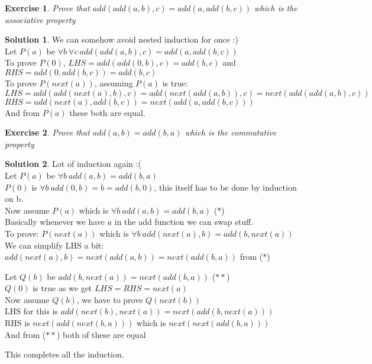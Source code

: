 \documentclass[a4paper,10pt]{article}
\newtheorem{exercise}{Exercise}[section]
\theoremstyle{definition} %
\newtheorem*{solution}{Solution}
\begin{document}
    \begin{exercise}
        Prove that $add(add(a,b), c) = add(a, add(b,c))$ which is the associative property
    \end{exercise}
    \begin{solution}
        We can somehow avoid nested induction for once :) \\
        Let $P(a)$ be $\forall b \ \forall c \ add(add(a,b), c) = add(a, add(b,c))$ \\
        To prove $P(0)$, $LHS = add(add(0,b), c) = add(b,c)$ and $RHS = add(0, add(b,c)) = add(b,c)$ \\
        To prove $P(next(a))$, assuming $P(a)$ is true: \\
        $LHS = add(add(next(a),b), c) = add(next(add(a,b)), c) = next(add(add(a,b), c))$ \\
        $RHS = add(next(a), add(b,c)) = next(add(a, add(b,c)))$ \\
        And from $P(a)$ these both are equal.
    \end{solution}

    \begin{exercise}
        Prove that $add(a,b) = add(b,a)$ which is the commutative property
    \end{exercise}
    \begin{solution}
        Lot of induction again :( \\
        Let $P(a)$ be $\forall b \ add(a,b) = add(b,a)$ \\
        $P(0)$ is $\forall b \ add(0,b) = b = add(b,0)$, this itself has to be done by induction on b. \\
        Now assume $P(a)$ which is $\forall b \ add(a,b) = add(b,a)$ \quad ($\ast$) \\
        Basically whenever we have $a$ in the add function we can swap stuff. \\
        To prove: $P(next(a))$ which is $\forall b \ add(next(a),b) = add(b,next(a))$ \\
        We can simplify LHS a bit: $add(next(a),b) = next(add(a,b)) = next(add(b,a))$ from ($\ast$)
        \begin{adjustwidth}{1cm}{0cm}
            Let $Q(b)$ be $add(b, next(a)) = next(add(b,a))$ \quad ($\ast\ast$) \\
            $Q(0)$ is true as we get $LHS = RHS = next(a)$ \\
            Now assume $Q(b)$, we have to prove $Q(next(b))$ \\
            LHS for this is $add(next(b), next(a)) = next(add(b, next(a)))$ \\
            RHS is $next(add(next(b,a)))$ which is $next(next(add(b,a)))$ \\
            And from ($\ast\ast$) both of these are equal
        \end{adjustwidth}
        This completes all the induction.
    \end{solution}
\end{document}
